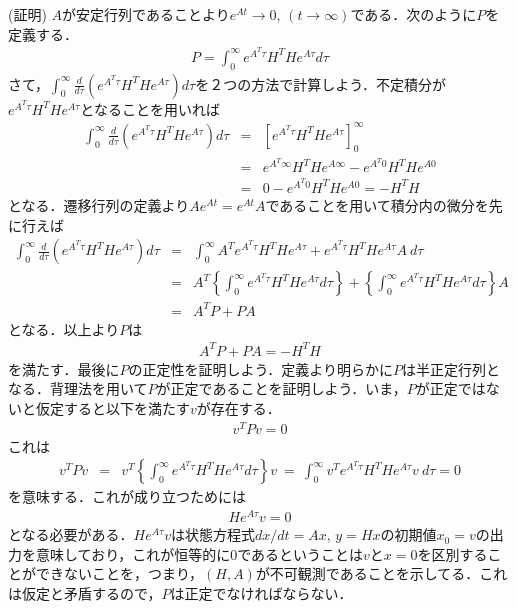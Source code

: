 \noindent
(証明)
$A$が安定行列であることより$e^{At} \rightarrow 0$, $(t \rightarrow \infty)$である．次のように$P$を定義する．
\begin{eqnarray}
	P = \int_0^\infty e^{A^T \tau} H^T H e^{A \tau} d \tau
\end{eqnarray}
さて，$\int_0^\infty \frac{d}{d \tau} \left( e^{A^T \tau} H^T H e^{A \tau} \right) d \tau$を２つの方法で計算しよう．不定積分が$e^{A^T \tau} H^T H e^{A \tau}$となることを用いれば
\begin{eqnarray}
	\int_0^\infty \frac{d}{d \tau} \left( e^{A^T \tau} H^T H e^{A \tau} \right) d \tau 
	& = & \left [ e^{A^T \tau} H^T H e^{A \tau}  \right]_0^\infty
\nonumber \\
	& = & e^{A^T \infty} H^T H e^{A \infty} - e^{A^T 0} H^T H e^{A 0}
\nonumber \\
	& = & 0 - e^{A^T 0} H^T H e^{A 0} = - H^T H
\end{eqnarray}
となる．遷移行列の定義より$A e^{At} = e^{At}A$であることを用いて積分内の微分を先に行えば
\begin{eqnarray}
	\int_0^\infty \frac{d}{d \tau} \left( e^{A^T \tau} H^T H e^{A \tau} \right) d \tau 
	& = & \int_0^\infty A^T e^{A^T \tau} H^T H e^{A \tau} + e^{A^T \tau} H^T H e^{A \tau} A \ d \tau 
\nonumber \\
	& = & A^T \left \{ \int_0^\infty e^{A^T \tau} H^T H e^{A \tau} d \tau \right \}
		+ \left \{ \int_0^\infty e^{A^T \tau} H^T H e^{A \tau} d \tau \right \} A
\nonumber \\
	& = & A^T P + P A
\end{eqnarray}
となる．以上より$P$は
\begin{eqnarray}
	A^T P + P A = - H^T H
\end{eqnarray}
を満たす．最後に$P$の正定性を証明しよう．定義より明らかに$P$は半正定行列となる．背理法を用いて$P$が正定であることを証明しよう．いま，$P$が正定ではないと仮定すると以下を満たす$v$が存在する．
\begin{eqnarray}
	v^T P v = 0
\end{eqnarray}
これは
\begin{eqnarray}
	v^T P v & = & v^T \left \{ \int_0^\infty e^{A^T \tau} H^T H e^{A \tau} d \tau \right \} v
	\ = \  \int_0^\infty v^T e^{A^T \tau} H^T H e^{A \tau} v \ d \tau = 0
\end{eqnarray}
を意味する．これが成り立つためには
\begin{eqnarray}
	H e^{A \tau} v = 0
\end{eqnarray}
となる必要がある．$H e^{A \tau} v$は状態方程式$dx/dt = Ax$, $y = H x$の初期値$x_0=v$の出力を意味しており，これが恒等的に$0$であるということは$v$と$x=0$を区別することができないことを，つまり，$(H,A)$が不可観測であることを示してる．これは仮定と矛盾するので，$P$は正定でなければならない．

